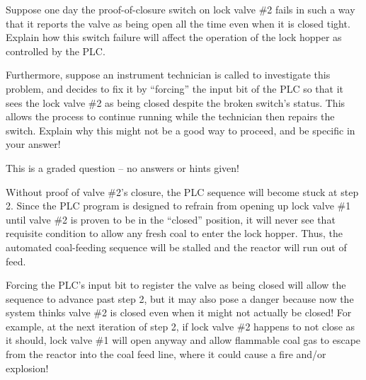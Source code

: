 \vskip 10pt

Suppose one day the proof-of-closure switch on lock valve \#2 fails in such a way that it reports the valve as being open all the time even when it is closed tight.  Explain how this switch failure will affect the operation of the lock hopper as controlled by the PLC.

\vskip 10pt

Furthermore, suppose an instrument technician is called to investigate this problem, and decides to fix it by ``forcing'' the input bit of the PLC so that it sees the lock valve \#2 as being closed despite the broken switch's status.  This allows the process to continue running while the technician then repairs the switch.  Explain why this might not be a good way to proceed, and be specific in your answer!

\vfil 

\eject






This is a graded question -- no answers or hints given!







Without proof of valve \#2's closure, the PLC sequence will become stuck at step 2.  Since the PLC program is designed to refrain from opening up lock valve \#1 until valve \#2 is proven to be in the ``closed'' position, it will never see that requisite condition to allow any fresh coal to enter the lock hopper.  Thus, the automated coal-feeding sequence will be stalled and the reactor will run out of feed.

\vskip 10pt

Forcing the PLC's input bit to register the valve as being closed will allow the sequence to advance past step 2, but it may also pose a danger because now the system thinks valve \#2 is closed even when it might not actually be closed!  For example, at the next iteration of step 2, if lock valve \#2 happens to not close as it should, lock valve \#1 will open anyway and allow flammable coal gas to escape from the reactor into the coal feed line, where it could cause a fire and/or explosion!



